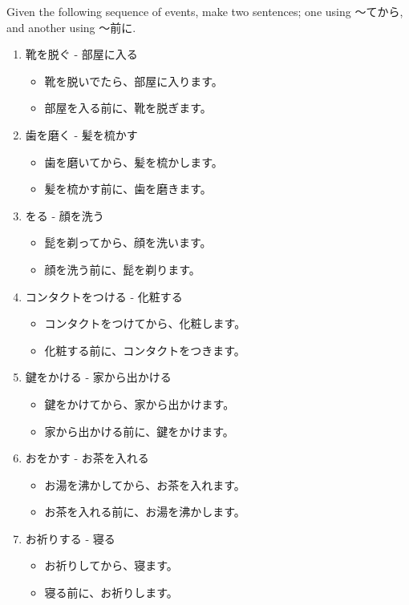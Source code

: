\documentclass[notoc,notitlepage]{tufte-book}
\begin{document}
\begin{ex}
  Given the following sequence of events, make two sentences; one using 〜てから, and another using 〜前に.
  \begin{enumerate}
    \item 靴を脱ぐ - 部屋に入る
      \begin{itemize}
        \item 靴を脱いでたら、部屋に入ります。
        \item 部屋を入る前に、靴を脱ぎます。
      \end{itemize}
    \item 歯を磨く - 髪を梳かす
      \begin{itemize}
        \item 歯を磨いてから、髪を梳かします。
        \item 髪を梳かす前に、歯を磨きます。
      \end{itemize}
    \item {}をる - 顔を洗う
      \begin{itemize}
        \item 髭を剃ってから、顔を洗います。
        \item 顔を洗う前に、髭を剃ります。
      \end{itemize}
    \item コンタクトをつける - 化粧する
      \begin{itemize}
        \item コンタクトをつけてから、化粧します。
        \item 化粧する前に、コンタクトをつきます。
      \end{itemize}
    \item 鍵をかける - 家から出かける
      \begin{itemize}
        \item 鍵をかけてから、家から出かけます。
        \item 家から出かける前に、鍵をかけます。
      \end{itemize}
    \item おをかす - お茶を入れる
      \begin{itemize}
        \item お湯を沸かしてから、お茶を入れます。
        \item お茶を入れる前に、お湯を沸かします。
      \end{itemize}
    \item お祈りする - 寝る
      \begin{itemize}
        \item お祈りしてから、寝ます。
        \item 寝る前に、お祈りします。
      \end{itemize}
  \end{enumerate}
\end{ex}
\end{document}
